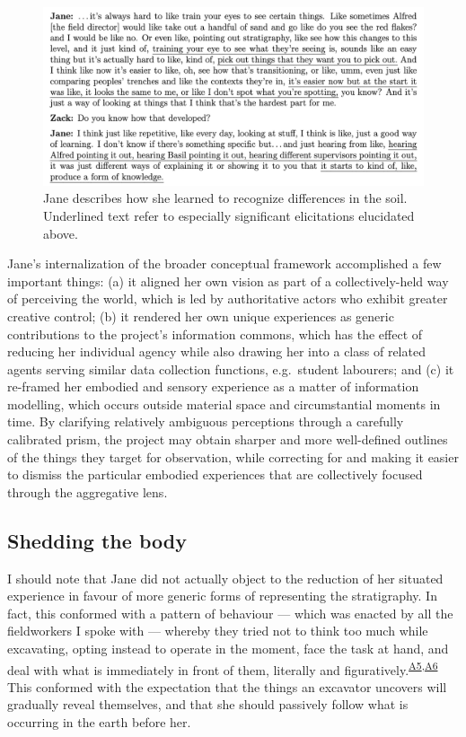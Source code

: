 \documentclass{article}
\begin{document}
\begin{figure}
\centering
\includegraphics[width=6in]{../figures/training-eye.png}
\caption{Jane describes how she learned to recognize differences in the
soil. Underlined text refer to especially significant elicitations
elucidated above.}\label{fig-training-eye}
\end{figure}

Jane's internalization of the broader conceptual framework accomplished
a few important things: (a) it aligned her own vision as part of a
collectively-held way of perceiving the world, which is led by
authoritative actors who exhibit greater creative control; (b) it
rendered her own unique experiences as generic contributions to the
project's information commons, which has the effect of reducing her
individual agency while also drawing her into a class of related agents
serving similar data collection functions, e.g.~student labourers; and
(c) it re-framed her embodied and sensory experience as a matter of
information modelling, which occurs outside material space and
circumstantial moments in time. By clarifying relatively ambiguous
perceptions through a carefully calibrated prism, the project may obtain
sharper and more well-defined outlines of the things they target for
observation, while correcting for and making it easier to dismiss the
particular embodied experiences that are collectively focused through
the aggregative lens.

\subsection{Shedding the body}\label{shedding-the-body}

I should note that Jane did not actually object to the reduction of her
situated experience in favour of more generic forms of representing the
stratigraphy. In fact, this conformed with a pattern of behaviour ---
which was enacted by all the fieldworkers I spoke with --- whereby they
tried not to think too much while excavating, opting instead to operate
in the moment, face the task at hand, and deal with what is immediately
in front of them, literally and
figuratively.\textsuperscript{\hyperref[sec-A5]{A5},\hyperref[sec-A6]{A6}}
This conformed with the expectation that the things an excavator
uncovers will gradually reveal themselves, and that she should passively
follow what is occurring in the earth before her.
\end{document}
